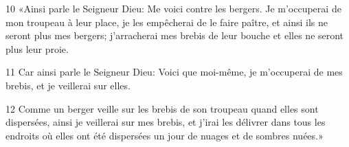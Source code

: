 
10 «Ainsi parle le Seigneur Dieu: Me voici contre les bergers. Je m’occuperai de mon troupeau à leur place, je les empêcherai de le faire paître, et ainsi ils ne seront plus mes bergers; j’arracherai mes brebis de leur bouche et elles ne seront plus leur proie.

11 Car ainsi parle le Seigneur Dieu: Voici que moi-même, je m’occuperai de mes brebis, et je veillerai sur elles.

12 Comme un berger veille sur les brebis de son troupeau quand elles sont dispersées, ainsi je veillerai sur mes brebis, et j’irai les délivrer dans tous les endroits où elles ont été dispersées un jour de nuages et de sombres nuées.»